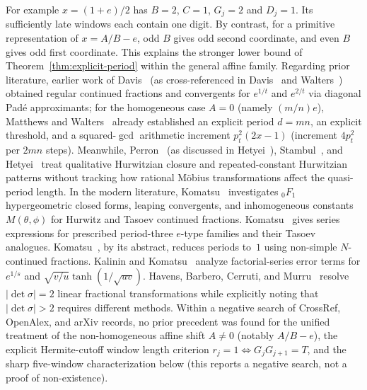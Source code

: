 \documentclass[11pt]{amsart}
\theoremstyle{definition}
\theoremstyle{remark}
\numberwithin{equation}{section}
\begin{document}
For example $x=(1+e)/2$ has $B=2$, $C=1$, $G_j=2$ and $D_j=1$.
Its sufficiently late windows each contain one digit. By contrast,
for a primitive representation of $x=A/B-e$, odd $B$ gives odd
second coordinate, and even $B$ gives odd first coordinate. This
explains the stronger lower bound of Theorem~\ref{thm:explicit-period}
within the general affine family. Regarding prior literature,
earlier work of Davis~\cite{Davis1945} (as cross-referenced in
Davis~\cite{Davis1978} and Walters~\cite{Walters1968}) obtained regular
continued fractions and convergents for $e^{1/t}$ and $e^{2/t}$ via
diagonal Pad\'e approximants; for the homogeneous case $A=0$ (namely
$(m/n)e$), Matthews and Walters~\cite[Theorem~1(b)]{MatthewsWalters1970}
already established an explicit period $d=mn$, an explicit threshold,
and a squared-$\gcd$ arithmetic increment $p_t^2(2x-1)$ (increment
$4p_t^2$ per $2mn$ steps). Meanwhile, Perron~\cite[Band~I, \S33, beginning on p.~119]{Perron1954}
(as discussed in Hetyei~\cite[\S1.2, p.~4]{Hetyei2014}), Stambul~\cite{Stambul}, and
Hetyei~\cite{Hetyei2014} treat qualitative Hurwitzian closure and
repeated-constant Hurwitzian patterns without tracking how rational
M\"obius transformations affect the quasi-period length. In the modern
literature, Komatsu~\cite{Komatsu1999JTNB,Komatsu2003Acta,Komatsu2003Tsukuba,Komatsu2007Czech,Komatsu2008Sarajevo}
investigates ${}_0F_1$ hypergeometric closed forms, leaping convergents,
and inhomogeneous constants $M(\theta,\phi)$ for Hurwitz and Tasoev
continued fractions. Komatsu~\cite[Theorems~1--4, pp.~49--50]{Komatsu2005Monatsh}
gives series expressions for prescribed period-three $e$-type families and
their Tasoev analogues. Komatsu~\cite{Komatsu2009JNT}, by its abstract,
reduces periods to~$1$ using non-simple $N$-continued fractions.
Kalinin and Komatsu~\cite{KalininKomatsu2026} analyze factorial-series
error terms for $e^{1/s}$ and $\sqrt{v/u}\tanh(1/\sqrt{uv})$.
Havens, Barbero, Cerruti, and Murru~\cite{HBCM2020} resolve $|\det\sigma|=2$ linear
fractional transformations while explicitly noting that $|\det\sigma|>2$
requires different methods. Within a negative search of CrossRef,
OpenAlex, and arXiv records, no prior precedent was found for the
unified treatment of the non-homogeneous affine shift $A\ne0$ (notably
$A/B-e$), the explicit Hermite-cutoff window length criterion
$r_j=1\iff G_jG_{j+1}=T$, and the sharp five-window characterization
below (this reports a negative search, not a proof of non-existence).
\end{document}
